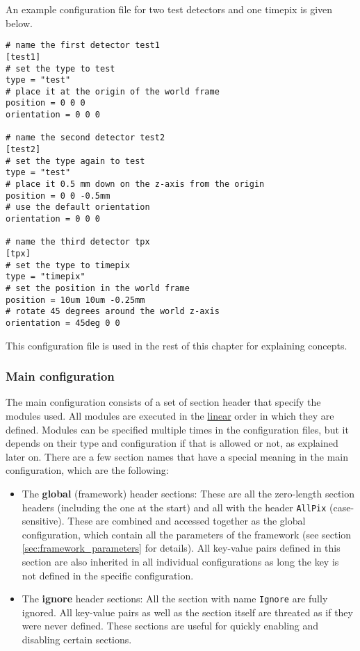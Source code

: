 An example configuration file for two test detectors and one timepix is given below. 
\begin{verbatim}
# name the first detector test1
[test1]
# set the type to test
type = "test"
# place it at the origin of the world frame
position = 0 0 0
orientation = 0 0 0

# name the second detector test2
[test2]
# set the type again to test
type = "test"
# place it 0.5 mm down on the z-axis from the origin
position = 0 0 -0.5mm
# use the default orientation
orientation = 0 0 0

# name the third detector tpx
[tpx]
# set the type to timepix
type = "timepix"
# set the position in the world frame
position = 10um 10um -0.25mm
# rotate 45 degrees around the world z-axis
orientation = 45deg 0 0
\end{verbatim}
This configuration file is used in the rest of this chapter for explaining concepts. 

\subsubsection{Main configuration}
\label{sec:main_config}
The main configuration consists of a set of section header that specify the modules used. All modules are executed in the \underline{linear} order in which they are defined. Modules can be specified multiple times in the configuration files, but it depends on their type and configuration if that is allowed or not, as explained later on. There are a few section names that have a special meaning in the main configuration, which are the following:
\begin{itemize}
\item The \textbf{global} (framework) header sections: These are all the zero-length section headers (including the one at the start) and all with the header \texttt{AllPix} (case-sensitive). These are combined and accessed together as the global configuration, which contain all the parameters of the framework (see section \ref{sec:framework_parameters} for details). All key-value pairs defined in this section are also inherited in all individual configurations as long the key is not defined in the specific configuration.
\item The \textbf{ignore} header sections: All the section with name \texttt{Ignore} are fully ignored. All key-value pairs as well as the section itself are threated as if they were never defined. These sections are useful for quickly enabling and disabling certain sections.
\end{itemize}

